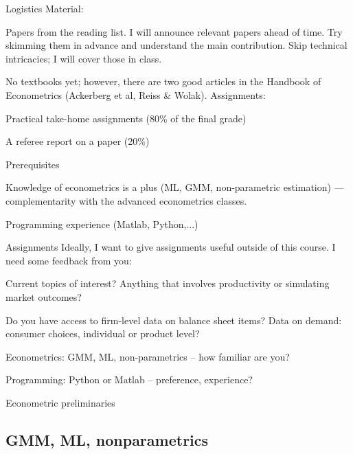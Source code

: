 \begin{frame}{Logistics}
	Material:
	\bi
		\item{Papers from the reading list. I will announce relevant papers ahead of time. Try skimming them in advance and understand the main contribution. Skip technical intricacies; I will cover those in class.}
		\item{No textbooks yet; however, there are two good articles in the Handbook of Econometrics (Ackerberg et al, Reiss \& Wolak)}.
	\ei
	Assignments:
	\bi
		\item{Practical take-home assignments (80\% of the final grade)}
		\item{A referee report on a paper (20\%)}
	\ei
\end{frame}

\begin{frame}{Prerequisites}
	\bi
		\item{Knowledge of econometrics is a plus (ML, GMM, non-parametric estimation) --- complementarity with the advanced econometrics classes.}
		\item{Programming experience (Matlab, Python,...)}
	\ei
\end{frame}

\begin{frame}{Assignments}
	Ideally, I want to give assignments useful outside of this course. I need some feedback from you:
	\bi
		\item Current topics of interest? Anything that involves productivity or simulating market outcomes?
		\item Do you have access to firm-level data on balance sheet items? Data on demand: consumer choices, individual or product level?
		\item Econometrics: GMM, ML, non-parametrics -- how familiar are you?
		\item Programming: Python or Matlab -- preference, experience?

	\ei
\end{frame}


\begin{frame}{}{}
	\begin{center}
		{\Large Econometric preliminaries}
	\end{center}
\end{frame}

\subsection{GMM, ML, nonparametrics}

